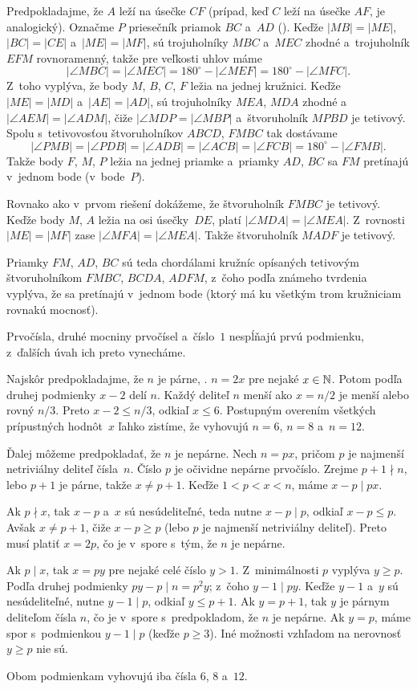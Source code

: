 {%
Predpokladajme, že $A$ leží na úsečke $CF$ (prípad, keď $C$ leží na úsečke $AF$, je analogický). Označme $P$ priesečník priamok $BC$ a~$AD$ (\obr). Keďže $|MB|=|ME|$, $|BC|=|CE|$ a~$|ME|=|MF|$, sú trojuholníky $MBC$ a~$MEC$ zhodné a~trojuholník $EFM$ rovnoramenný, takže pre veľkosti uhlov máme
$$
|\angle MBC|=|\angle MEC|=180^\circ-|\angle MEF|=180^\circ-|\angle MFC|.
$$
Z~toho vyplýva, že body $M$, $B$, $C$, $F$ ležia na jednej kružnici. Keďže $|ME|=|MD|$ a~$|AE|=|AD|$, sú trojuholníky $MEA$, $MDA$ zhodné a~ $|\angle AEM|=|\angle ADM|$, čiže $|\angle MDP=|\angle MBP|$ a~štvoruholník $MPBD$ je tetivový. Spolu s~tetivovosťou štvoruholníkov $ABCD$, $FMBC$ tak dostávame
$$
|\angle PMB|=|\angle PDB|=|\angle ADB|=|\angle ACB|=|\angle FCB|=180^\circ-|\angle FMB|.
$$
Takže body $F$, $M$, $P$ ležia na jednej priamke a~priamky $AD$, $BC$ sa $FM$ pretínajú v~jednom bode (v~bode~$P$).
%

\ineriesenie
Rovnako ako v~prvom riešení dokážeme, že štvoruholník $FMBC$ je tetivový.
Keďže body $M$, $A$ ležia na osi úsečky~$DE$, platí $|\angle MDA| = |\angle MEA|$. Z~rovnosti $|ME|=|MF|$ zase $|\angle MFA| = |\angle MEA|$. Takže štvoruholník $MADF$ je tetivový.

Priamky $FM$, $AD$, $BC$ sú teda chordálami kružníc opísaných tetivovým štvoruholníkom $FMBC$, $BCDA$, $ADFM$, z~čoho podľa známeho tvrdenia vyplýva, že sa pretínajú v~jednom bode (ktorý má ku všetkým trom kružniciam rovnakú mocnosť).}

{%
Prvočísla, druhé mocniny prvočísel a~číslo~$1$ nespĺňajú prvú podmienku, z~ďalších úvah ich preto vynecháme.

Najskôr predpokladajme, že $n$ je párne, \tj. $n=2x$ pre nejaké $x\in\Bbb N$.
Potom podľa druhej podmienky $x-2$ delí $n$. Každý deliteľ $n$ menší ako $x=n/2$ je menší alebo rovný $n/3$. Preto $x-2\le n/3$, odkiaľ $x\le 6$. Postupným overením všetkých prípustných hodnôt~$x$ ľahko zistíme, že vyhovujú  $n=6$, $n=8$ a~$n=12$.

Ďalej môžeme predpokladať, že $n$ je nepárne. Nech $n = px$, pričom $p$ je najmenší netriviálny deliteľ čísla~$n$. Číslo $p$ je očividne nepárne prvočíslo. Zrejme $p+1\nmid n$, lebo $p+1$ je párne, takže $x\ne p+1$.
Keďže $1 < p < x < n$, máme $x-p\mid px$.

Ak $p\nmid x$, tak $x-p$ a~$x$ sú nesúdeliteľné, teda nutne $x-p\mid p$, odkiaľ $x-p\le p$. Avšak $x\ne p+1$, čiže $x-p\ge p$ (lebo $p$ je najmenší netriviálny deliteľ). Preto musí platiť $x=2p$, čo je v~spore s~tým, že $n$ je nepárne.

Ak $p\mid x$, tak $x = py$ pre nejaké celé číslo $y>1$. Z~minimálnosti $p$ vyplýva $y\ge p$. Podľa druhej podmienky $py-p\mid n=p^2y$; z~čoho $y-1\mid py$. Keďže $y-1$ a~$y$ sú nesúdeliteľné, nutne $y-1\mid p$, odkiaľ $y\le p+1$. Ak $y=p+1$, tak $y$ je párnym deliteľom čísla $n$, čo je v~spore s~predpokladom, že $n$ je nepárne. Ak $y=p$, máme spor s~podmienkou $y-1\mid p$ (keďže $p\ge3$). Iné možnosti vzhľadom na nerovnosť $y\ge p$ nie sú.

\odpoved
Obom podmienkam vyhovujú iba čísla $6$, $8$ a~$12$.
}


